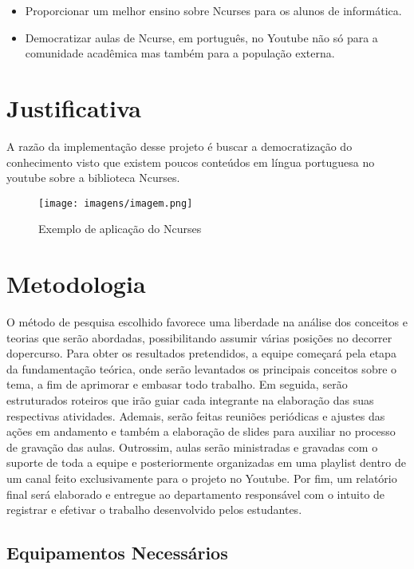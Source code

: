 \documentclass[a4paper,10pt]{article} %
\begin{document}
\begin{itemize}
 \item Proporcionar um melhor ensino sobre Ncurses para os alunos de informática.
 \item Democratizar aulas de Ncurse, em português,  no Youtube não só para a comunidade acadêmica mas também para a população externa.
\end{itemize}


\section{Justificativa}
A razão da implementação desse projeto é buscar a democratização do conhecimento visto que existem poucos conteúdos em língua portuguesa no youtube sobre a biblioteca Ncurses.

\begin{figure}[ht]
\centering
\texttt{[image: imagens/imagem.png]}
\caption{Exemplo de aplicação do Ncurses}
\label{fig:xsort}
\end{figure}


\section{Metodologia}
 O método de pesquisa escolhido favorece uma liberdade na análise dos conceitos e teorias que serão abordadas, possibilitando assumir várias posições no decorrer dopercurso. 
 Para obter os resultados pretendidos, a equipe começará pela etapa da fundamentação teórica, onde serão levantados os principais conceitos sobre o tema, a fim de aprimorar e embasar todo trabalho.
 Em seguida, serão estruturados roteiros  que irão guiar cada integrante na elaboração das suas respectivas atividades.
 Ademais,  serão feitas reuniões periódicas e ajustes das ações em andamento e também  a elaboração de slides para auxiliar no processo de gravação das aulas.
 Outrossim, aulas serão ministradas e gravadas com o suporte de toda a  equipe e posteriormente organizadas em uma playlist dentro de um canal feito exclusivamente para o projeto no Youtube.
 Por fim, um relatório final será elaborado e entregue ao departamento responsável com o intuito de registrar e efetivar o trabalho desenvolvido pelos estudantes.

\subsection{Equipamentos Necessários}
\end{document}
